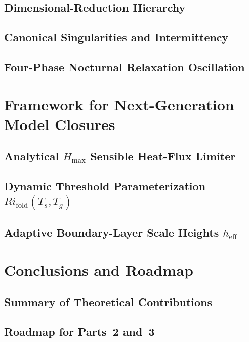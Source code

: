 \documentclass[11pt,letterpaper]{article}
\begin{document}
\subsection{Dimensional-Reduction Hierarchy}

\subsection{Canonical Singularities and Intermittency}

\subsection{Four-Phase Nocturnal Relaxation Oscillation}

\section{Framework for Next-Generation Model Closures}
\label{sec:closures}

\subsection{Analytical $H_{\max}$ Sensible Heat-Flux Limiter}

\subsection{Dynamic Threshold Parameterization $Ri_{\text{fold}}(T_s, T_g)$}

\subsection{Adaptive Boundary-Layer Scale Heights $h_{\text{eff}}$}

\section{Conclusions and Roadmap}
\label{sec:conclusion}

\subsection{Summary of Theoretical Contributions}

\subsection{Roadmap for Parts~2 and~3}

\appendix
\end{document}
